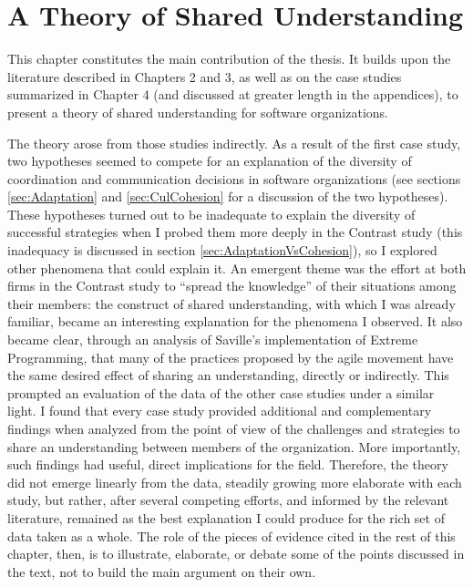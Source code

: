 \chapter{A Theory of Shared Understanding}
\label{chap:SharedUnd}


This chapter constitutes the main contribution of the thesis. It builds upon the literature described in Chapters 2 and 3, as well as on the case studies summarized in Chapter 4 (and discussed at greater length in the appendices), to present a theory of shared understanding for software organizations.

The theory arose from those studies indirectly. As a result of the first case study, two hypotheses seemed to compete for an explanation of the diversity of coordination and communication decisions in software organizations (see sections \ref{sec:Adaptation} and \ref{sec:CulCohesion} for a discussion of the two hypotheses). These hypotheses turned out to be inadequate to explain the diversity of successful strategies when I probed them more deeply in the Contrast study (this inadequacy is discussed in section \ref{sec:AdaptationVsCohesion}), so I explored other phenomena that could explain it. An emergent theme was the effort at both firms in the Contrast study to ``spread the knowledge'' of their situations among their members: the construct of shared understanding, with which I was already familiar, became an interesting explanation for the phenomena I observed. It also became clear, through an analysis of Saville's implementation of Extreme Programming, that many of the practices proposed by the agile movement have the same desired effect of sharing an understanding, directly or indirectly. This prompted an evaluation of the data of the other case studies under a similar light. I found that every case study provided additional and complementary findings when analyzed from the point of view of the challenges and strategies to share an understanding between members of the organization. More importantly, such findings had useful, direct implications for the field. Therefore, the theory did not emerge linearly from the data, steadily growing more elaborate with each study, but rather, after several competing efforts, and informed by the relevant literature, remained as the best explanation I could produce for the rich set of data taken as a whole. The role of the pieces of evidence cited in the rest of this chapter, then, is to illustrate, elaborate, or debate some of the points discussed in the text, not to build the main argument on their own.

